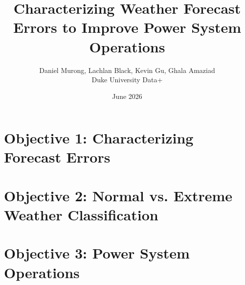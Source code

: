\documentclass{article}
\title{Characterizing Weather Forecast Errors to Improve Power System Operations}
\author{Daniel Murong, Lachlan Black, Kevin Gu, Ghala Amaziad \\ \small Duke University Data+}
\date{June 2026}
\begin{document}
\raggedright
\setlength{\footnotesep}{1.5\footnotesep}
\maketitle



\tableofcontents






\part{Objective 1: Characterizing Forecast Errors}

















\part{Objective 2: Normal vs. Extreme Weather Classification}





\part{Objective 3: Power System Operations}



















\end{document}

